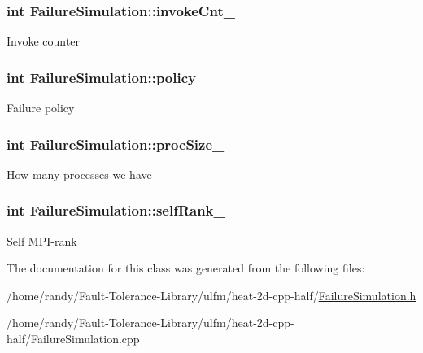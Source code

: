 \subsubsection[{\texorpdfstring{invoke\+Cnt\+\_\+}{invokeCnt_}}]{\setlength{\rightskip}{0pt plus 5cm}int Failure\+Simulation\+::invoke\+Cnt\+\_\+\hspace{0.3cm}{\ttfamily [private]}}\hypertarget{classFailureSimulation_aefff5ead95ce91fc60cb8a814aa1ea06}{}\label{classFailureSimulation_aefff5ead95ce91fc60cb8a814aa1ea06}
Invoke counter 
\subsubsection[{\texorpdfstring{policy\+\_\+}{policy_}}]{\setlength{\rightskip}{0pt plus 5cm}int Failure\+Simulation\+::policy\+\_\+\hspace{0.3cm}{\ttfamily [private]}}\hypertarget{classFailureSimulation_a59f1e391b8056b83f2bde5450d3f95c2}{}\label{classFailureSimulation_a59f1e391b8056b83f2bde5450d3f95c2}
Failure policy 
\subsubsection[{\texorpdfstring{proc\+Size\+\_\+}{procSize_}}]{\setlength{\rightskip}{0pt plus 5cm}int Failure\+Simulation\+::proc\+Size\+\_\+\hspace{0.3cm}{\ttfamily [private]}}\hypertarget{classFailureSimulation_a1f1cd48b5fe41eed41be69c20d6fe150}{}\label{classFailureSimulation_a1f1cd48b5fe41eed41be69c20d6fe150}
How many processes we have 
\subsubsection[{\texorpdfstring{self\+Rank\+\_\+}{selfRank_}}]{\setlength{\rightskip}{0pt plus 5cm}int Failure\+Simulation\+::self\+Rank\+\_\+\hspace{0.3cm}{\ttfamily [private]}}\hypertarget{classFailureSimulation_a37dba780d7b6177b01e369f1c2ed3466}{}\label{classFailureSimulation_a37dba780d7b6177b01e369f1c2ed3466}
Self M\+P\+I-\/rank 

The documentation for this class was generated from the following files\+:\begin{DoxyCompactItemize}
\item 
/home/randy/\+Fault-\/\+Tolerance-\/\+Library/ulfm/heat-\/2d-\/cpp-\/half/\hyperlink{FailureSimulation_8h}{Failure\+Simulation.\+h}\item 
/home/randy/\+Fault-\/\+Tolerance-\/\+Library/ulfm/heat-\/2d-\/cpp-\/half/Failure\+Simulation.\+cpp\end{DoxyCompactItemize}
